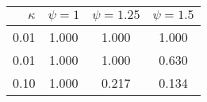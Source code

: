 \begin{tabular}{r|ccc}
$\kappa$ & \multicolumn{1}{c}{$\psi = 1$} & \multicolumn{1}{c}{$\psi = 1.25$} & \multicolumn{1}{c}{$\psi = 1.5$} \\
\hline
0.01 & 1.000 & 1.000 & 1.000 \\
0.01 & 1.000 & 1.000 & 0.630 \\
0.10 & 1.000 & 0.217 & 0.134 \\
\end{tabular}